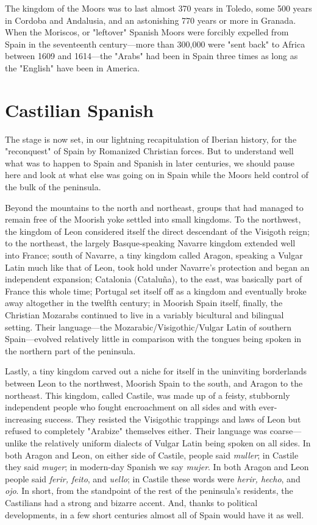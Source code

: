 The kingdom of the Moors was to last almost 370 years in Toledo, some 500 years in Cordoba and Andalusia, and an astonishing
770 years or more in Granada. When the Moriscos, or "leftover"
Spanish Moors were forcibly expelled from Spain in the seventeenth century---more than 300,000 were "sent back" to Africa between 1609
and 1614---the "Arabs" had been in Spain three times as long as the
"English" have been in America.

\section{Castilian Spanish}

The stage is now set, in our lightning recapitulation of Iberian
history, for the "reconquest" of Spain by Romanized Christian forces.
But to understand well what was to happen to Spain and Spanish in
later centuries, we should pause here and look at what else was going
on in Spain while the Moors held control of the bulk of the peninsula.

Beyond the mountains to the north and northeast, groups that
had managed to remain free of the Moorish yoke settled into small
kingdoms. To the northwest, the kingdom of Leon considered itself the
direct descendant of the Visigoth reign; to the northeast, the largely
Basque-speaking Navarre kingdom extended well into France; south of
Navarre, a tiny kingdom called Aragon, speaking a Vulgar Latin much
like that of Leon, took hold under Navarre's protection and began an
independent expansion; Catalonia (Cataluña), to the east, was basically
part of France this whole time; Portugal set itself off as a kingdom and
eventually broke away altogether in the twelfth century; in Moorish
Spain itself, finally, the Christian Mozarabs continued to live in a variably bicultural and bilingual setting. Their language---the Mozarabic/Visigothic/Vulgar Latin of southern Spain---evolved relatively little in
comparison with the tongues being spoken in the northern part of the
peninsula.

Lastly, a tiny kingdom carved out a niche for itself in the uninviting borderlands between Leon to the northwest, Moorish Spain to
the south, and Aragon to the northeast. This kingdom, called Castile,
was made up of a feisty, stubbornly independent people who fought
encroachment on all sides and with ever-increasing success. They resisted the Visigothic trappings and laws of Leon but refused to completely "Arabize" themselves either. Their language was coarse---unlike the relatively uniform dialects of Vulgar Latin being spoken on all
sides. In both Aragon and Leon, on either side of Castile, people said
\emph{muller}; in Castile they said \emph{muger}; in modern-day Spanish we say
\emph{mujer}. In both Aragon and Leon people said \emph{ferir, feito}, and \emph{uello}; in
Castile these words were \emph{herir, hecho}, and \emph{ojo}. In short, from the
standpoint of the rest of the peninsula's residents, the Castilians had
a strong and bizarre accent. And, thanks to political developments, in
a few short centuries almost all of Spain would have it as well.

